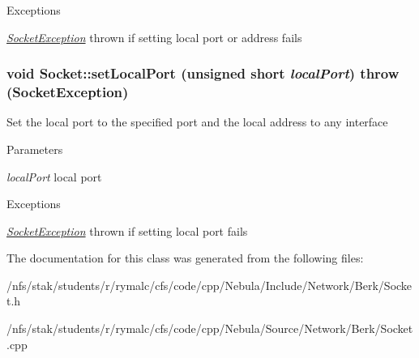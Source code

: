 \begin{DoxyExceptions}{Exceptions}
\item[{\em \hyperlink{classSocketException}{SocketException}}]thrown if setting local port or address fails \end{DoxyExceptions}
\hypertarget{classSocket_a773fe4a35146002de76952e16fdebcfa}{
\subsubsection[{setLocalPort}]{\setlength{\rightskip}{0pt plus 5cm}void Socket::setLocalPort (unsigned short {\em localPort})  throw ({\bf SocketException})}}
\label{classSocket_a773fe4a35146002de76952e16fdebcfa}
Set the local port to the specified port and the local address to any interface 
\begin{DoxyParams}{Parameters}
\item[{\em localPort}]local port \end{DoxyParams}

\begin{DoxyExceptions}{Exceptions}
\item[{\em \hyperlink{classSocketException}{SocketException}}]thrown if setting local port fails \end{DoxyExceptions}


The documentation for this class was generated from the following files:\begin{DoxyCompactItemize}
\item 
/nfs/stak/students/r/rymalc/cfs/code/cpp/Nebula/Include/Network/Berk/Socket.h\item 
/nfs/stak/students/r/rymalc/cfs/code/cpp/Nebula/Source/Network/Berk/Socket.cpp\end{DoxyCompactItemize}
